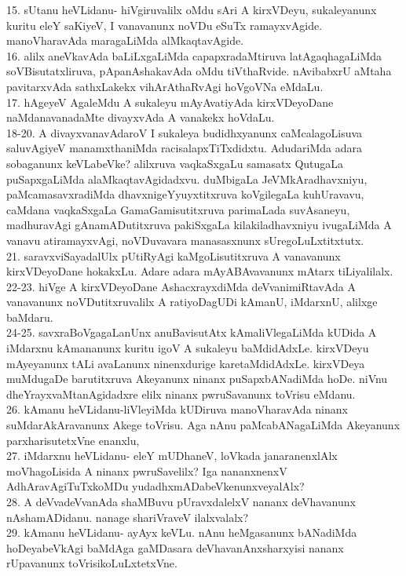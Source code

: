 \documentclass{article}
\begin{document}
15. sUtanu heVLidanu- hiVgiruvalilx oMdu sAri A kirxVDeyu, sukaleyanunx kuritu eleY saKiyeV, I vanavanunx noVDu eSuTx ramayxvAgide. manoVharavAda maragaLiMda alMkaqtavAgide.\\
16. alilx aneVkavAda baLiLxgaLiMda capapxradaMtiruva latAgaqhagaLiMda soVBisutatxliruva, pApanAshakavAda oMdu tiVthaRvide. nAvibabxrU aMtaha pavitarxvAda sathxLakekx vihArAthaRvAgi hoVgoVNa eMdaLu.\\
17. hAgeyeV AgaleMdu A sukaleyu mAyAvatiyAda kirxVDeyoDane naMdanavanadaMte divayxvAda A vanakekx hoVdaLu.\\
18-20. A divayxvanavAdaroV I sukaleya budidhxyanunx caMcalagoLisuva saluvAgiyeV manamxthaniMda racisalapxTiTxdidxtu. AdudariMda adara sobaganunx keVLabeVke? alilxruva vaqkaSxgaLu samasatx QutugaLa puSapxgaLiMda alaMkaqtavAgidadxvu. duMbigaLa JeVMkAradhavxniyu, paMcamasavxradiMda dhavxnigeYyuyxtitxruva koVgilegaLa kuhUravavu, caMdana vaqkaSxgaLa GamaGamisutitxruva parimaLada suvAsaneyu, madhuravAgi gAnamADutitxruva pakiSxgaLa kilakiladhavxniyu ivugaLiMda A vanavu atiramayxvAgi, noVDuvavara manasasxnunx sUregoLuLxtitxtutx.\\
21. saravxviSayadalUlx pUtiRyAgi kaMgoLisutitxruva A vanavanunx kirxVDeyoDane hokakxLu. Adare adara mAyABAvavanunx mAtarx tiLiyalilalx.\\
22-23. hiVge A kirxVDeyoDane AshacxrayxdiMda deVvanimiRtavAda A vanavanunx noVDutitxruvalilx A ratiyoDagUDi kAmanU, iMdarxnU, alilxge baMdaru.\\
24-25. savxraBoVgagaLanUnx anuBavisutAtx kAmaliVlegaLiMda kUDida A iMdarxnu kAmananunx kuritu igoV A sukaleyu baMdidAdxLe. kirxVDeyu mAyeyanunx tALi avaLanunx ninenxdurige karetaMdidAdxLe. kirxVDeya muMdugaDe barutitxruva Akeyanunx ninanx puSapxbANadiMda hoDe. niVnu dheYrayxvaMtanAgidadxre elilx ninanx pwruSavanunx toVrisu eMdanu.\\
26. kAmanu heVLidanu-liVleyiMda kUDiruva manoVharavAda ninanx suMdarAkAravanunx Akege toVrisu. Aga nAnu paMcabANagaLiMda Akeyanunx parxharisutetxVne enanxlu,\\
27. iMdarxnu heVLidanu- eleY mUDhaneV, loVkada janaranenxlAlx moVhagoLisida A ninanx pwruSavelilx? Iga nananxnenxV AdhAravAgiTuTxkoMDu yudadhxmADabeVkenunxveyalAlx?\\
28. A deVvadeVvanAda shaMBuvu pUravxdalelxV nananx deVhavanunx nAshamADidanu. nanage shariVraveV ilalxvalalx?\\
29. kAmanu heVLidanu- ayAyx keVLu. nAnu heMgasanunx bANadiMda hoDeyabeVkAgi baMdAga gaMDasara deVhavanAnxsharxyisi nananx rUpavanunx toVrisikoLuLxtetxVne.\\
\end{document}
